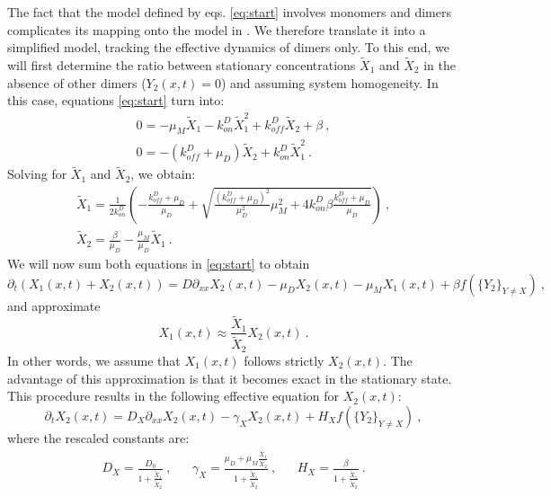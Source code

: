 \documentclass[a4paper,10pt]{article}
\begin{document}
The fact that the model defined by eqs. \eqref{eq:start} involves monomers and dimers complicates its mapping onto the model in \cite{Majka2023}. We therefore translate it into a simplified model, tracking the effective dynamics of dimers only. To this end, we will first determine the ratio between stationary concentrations $\tilde X_1$ and $\tilde X_2$ in the absence of other dimers ($Y_2(x,t)=0$) and assuming system homogeneity. In this case, equations \eqref{eq:start} turn into:
\begin{equation}
\begin{gathered}
0=-\mu_M \tilde X_1-k_{on}^D \tilde X_1^2+k_{off}^D \tilde X_2+\beta ~,\\
0=-(k_{off}^D+\mu_D)\tilde X_2+k_{on}^D \tilde X_1^2 ~.
\end{gathered}
\end{equation}
Solving for $\tilde X_1$ and $\tilde X_2$, we obtain:
\begin{equation}
\begin{gathered}
\tilde X_1=\frac{1}{2k_{on}^D}\left(-\frac{k_{off}^D+\mu_D}{\mu_D}+\sqrt{\frac{(k_{off}^D+\mu_D)^2}{\mu_D^2}\mu_M^2+4k_{on}^D \beta \frac{k_{off}^D+\mu_D}{\mu_D}} \right) ~,\\
\tilde X_2=\frac{\beta}{\mu_D}-\frac{\mu_M}{\mu_D}\tilde X_1 ~.
\end{gathered}
\end{equation}
We will now sum both equations in \eqref{eq:start} to obtain
\begin{equation}
\partial_t(X_1(x,t)+X_2(x,t))=D\partial_{xx}X_2(x,t)-\mu_D X_2(x,t)-\mu_M X_1(x,t)+\beta f(\{Y_2\}_{Y\neq X}) ~,
\end{equation}
and approximate
\begin{equation}
X_1(x,t)\approx \frac{\tilde X_1}{\tilde X_2} X_2(x,t) ~.
\end{equation}
In other words, we assume that $X_1(x,t)$ follows strictly $X_2(x,t)$. The advantage of this approximation is that it becomes exact in the stationary state. This procedure results in the following effective equation for $X_2(x,t)$:
\begin{equation}
\partial_t X_2(x,t)= D_X\partial_{xx} X_2(x,t)-\gamma_X X_2(x,t)+H_X f(\{Y_2\}_{Y\neq X}) ~, \label{eq:effectiveform}
\end{equation}
where the rescaled constants are:
\begin{align}
D_X=\frac{D_0}{1+\frac{\tilde X_1}{\tilde X_2}} ~, &&\gamma_X=\frac{\mu_D+\mu_M\frac{\tilde X_1}{\tilde X_2}}{1+\frac{\tilde X_1}{\tilde X_2}} ~, &&H_X=\frac{\beta}{1+\frac{\tilde X_1}{\tilde X_2}} ~.
\end{align}
\end{document}
